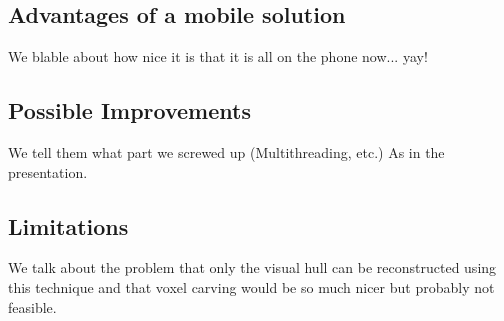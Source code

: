 \documentclass[10pt,twocolumn,letterpaper]{article}
\begin{document}
\subsection{Advantages of a mobile solution}

We blable about how nice it is that it is all on the phone now... yay!

\subsection{Possible Improvements}

We tell them what part we screwed up (Multithreading, etc.) As in the presentation.

\subsection{Limitations}

We talk about the problem that only the visual hull can be reconstructed using this technique and that voxel carving would be so much nicer but probably not feasible.


{\small


}
\end{document}
